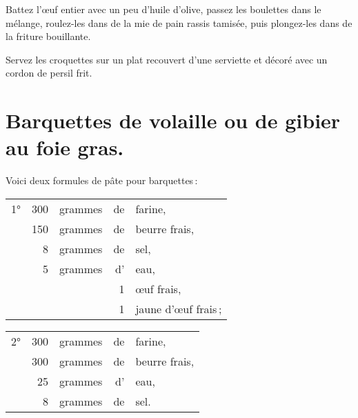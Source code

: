 Battez l'œuf entier avec un peu d'huile d'olive, passez les boulettes dans le
mélange, roulez-les dans de la mie de pain rassis tamisée, puis plongez-les dans
de la friture bouillante.

Servez les croquettes sur un plat recouvert d'une serviette et décoré avec un
cordon de persil frit.

\section*{\centering Barquettes de volaille ou de gibier au foie gras.}
{}

Voici deux formules de pâte pour barquettes :

\footnotesize
\begin{longtable}{p{4em}rp{4em}rp{12em}}
\setlength\tabcolsep{.1em}
\hspace{.65em}1° & 300 & grammes & de & farine,                                                           \\
        & 150 & grammes & de & beurre frais,                                                              \\
        &   8 & grammes & de & sel,                                                                       \\
        &   5 & grammes & d' & eau,                                                                       \\
        &     &         &  1 & œuf frais,                                                                 \\
        &     &         &  1 & jaune d'œuf frais ;                                                        \\
\end{longtable}
\normalsize

\footnotesize
\begin{longtable}{p{4em}rp{4em}rp{12em}}
\setlength\tabcolsep{.1em}
\hspace{.65em}2° & 300 & grammes & de & farine,                                                           \\
        & 300 & grammes & de & beurre frais,                                                              \\
        &  25 & grammes & d' & eau,                                                                       \\
        &   8 & grammes & de & sel.                                                                       \\
\end{longtable}
\normalsize

